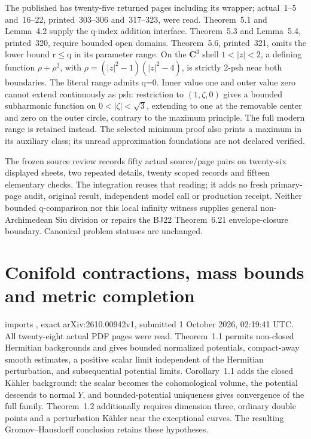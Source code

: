 The published \cite{Slodkowski84BremermannPublished} has twenty-five
returned pages including its wrapper; actual~1--5 and~16--22,
printed~303--306 and~317--323, were read. Theorem~5.1 and
Lemma~4.2 supply the q-index addition interface. Theorem~5.3 and
Lemma~5.4, printed~320, require bounded open domains.
Theorem~5.6, printed~321, omits the lower bound r\(\leq\)q in its
parameter range. On the \(\mathbf C^3\) shell \(1<|z|<2\),
a defining function \(\rho+\rho^2\), with
\(\rho=(|z|^2-1)(|z|^2-4)\), is strictly 2-psh near both boundaries.
The literal range admits q=0. Inner value one and outer value zero
cannot extend continuously as psh: restriction to
\((1,\zeta,0)\) gives a bounded subharmonic function on
\(0<|\zeta|<\sqrt3\), extending to one at the removable center and
zero on the outer circle, contrary to the maximum principle.
The full modern range is retained instead. The selected minimum
proof also prints a maximum in its auxiliary class; its unread
approximation foundations are not declared verified.

The frozen source review records fifty actual source/page pairs on
twenty-six displayed sheets, two repeated details, twenty scoped
records and fifteen elementary checks. The integration reuses that
reading; it adds no fresh primary-page audit, original result,
independent model call or production receipt. Neither bounded
q-comparison nor this local infinity witness supplies general
non-Archimedean Siu division or repairs the BJ22 Theorem~6.21
envelope-closure boundary. Canonical problem statuses are unchanged.

\section{Conifold contractions, mass bounds and metric completion}
\label{sec:provenance-conifold-contractions}

 imports
\cite{GuyettMcGowan26ConifoldV1}, exact arXiv:2610.00942v1,
submitted 1 October 2026, 02:19:41 UTC. All twenty-eight actual
PDF pages were read. Theorem~1.1 permits non-closed Hermitian
backgrounds and gives bounded normalized potentials, compact-away
smooth estimates, a positive scalar limit independent of the
Hermitian perturbation, and subsequential potential limits.
Corollary~1.1 adds the closed K\"ahler background: the scalar becomes
the cohomological volume, the potential descends to normal $Y$, and
bounded-potential uniqueness gives convergence of the full family.
Theorem~1.2 additionally requires dimension three, ordinary double
points and a perturbation K\"ahler near the exceptional curves.
The resulting Gromov--Hausdorff conclusion retains these hypotheses.

